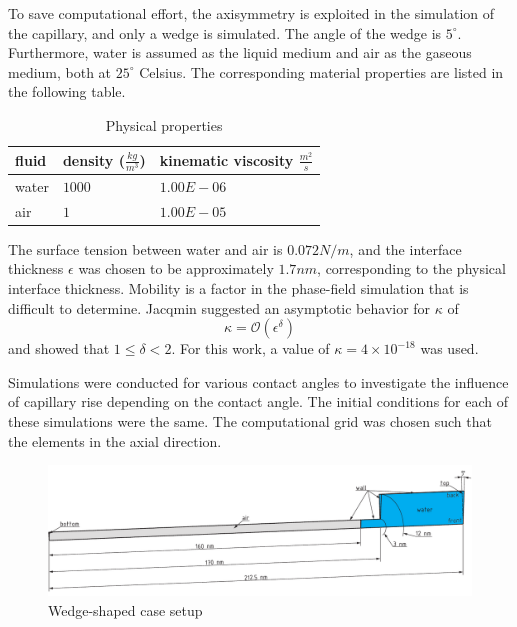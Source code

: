To save computational effort, the axisymmetry is exploited in the simulation of the capillary, and only a wedge is simulated. The angle of the wedge is \(5^\circ\). Furthermore, water is assumed as the liquid medium and air as the gaseous medium, both at \(25^\circ\) Celsius. The corresponding material properties are listed in the following table.

\begin{table}[h]
\centering
\caption{Physical properties}
\label{tab:physicalProperties_CaseSetup}
\begin{tabular}{lll}
fluid & density ($\frac{kg}{m^3}$) & kinematic viscosity $\frac{m^2}{s}$ \\ \hline
water & $1000$                     & $1.00E-06$                          \\
air   & $1$                        & $1.00E-05$                          \\ 
\end{tabular}
\end{table}

The surface tension between water and air is \(0.072 N/m\), and the interface thickness \( \epsilon \) was chosen to be approximately \(1.7 nm\), corresponding to the physical interface thickness. Mobility is a factor in the phase-field simulation that is difficult to determine. Jacqmin \cite{jacqmin1999CalculationTwoPhaseNavier} suggested an asymptotic behavior for \( \kappa \) of 
\begin{equation}
    \kappa = \mathcal{O}(\epsilon^{\delta})
\end{equation}
and showed that \( 1 \leq \delta < 2 \). For this work, a value of \( \kappa = 4 \times 10^{-18} \) was used.

Simulations were conducted for various contact angles to investigate the influence of capillary rise depending on the contact angle. The initial conditions for each of these simulations were the same. The computational grid was chosen such that the elements in the axial direction. 

\begin{figure}[h]
    \centering
    \includegraphics[width=.9\textwidth]{Pictures/Cap_5DEG.pdf}
    \caption{Wedge-shaped case setup}
    \label{fig: wedge_caseSetup}
\end{figure}

